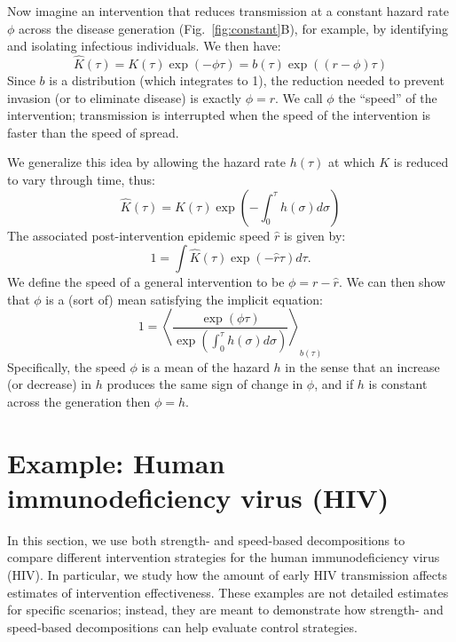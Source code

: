 \documentclass[12pt]{article}
\newcommand{\figref}[1]{Fig.~\ref{fig:#1}}
\newcommand{\eqlab}[1]{\label{eq:#1}}
\begin{document}
Now imagine an intervention that reduces transmission at a constant hazard rate $\phi$ across the disease generation (\figref{constant}B), for example, by identifying and isolating infectious individuals.
We then have:
\begin{equation}
	\hat K(\tau) = K(\tau)\exp(-\phi\tau) = b(\tau)\exp((r-\phi)\tau)
\end{equation}
Since $b$ is a distribution (which integrates to 1), the reduction needed to prevent invasion (or to eliminate disease) is exactly $\phi=r$. 
We call $\phi$ the ``speed'' of the intervention; transmission is interrupted when the speed of the intervention is faster than the speed of spread.

We generalize this idea by allowing the hazard rate $h(\tau)$ at which $K$ is reduced to vary through time, thus:
\begin{equation}
	\hat K(\tau) = K(\tau) \exp\left(-\int_0^\tau h(\sigma) d\sigma\right)
\end{equation}
The associated post-intervention epidemic speed $\hat r$ is given by:
\begin{equation}
	1 = \int \hat K(\tau) \exp(-\hat r\tau) d\tau.	
\end{equation}
We define the speed of a general intervention to be $\phi = r - \hat r$. 
We can then show that $\phi$ is a (sort of) mean satisfying the implicit equation:
\begin{equation}
	1 = \left\langle \frac{\exp(\phi \tau) }{\exp\left(\int_0^\tau h(\sigma) d\sigma\right)} \right\rangle_{b(\tau)}
	\eqlab{speedMean}
\end{equation}
Specifically, the speed $\phi$ is a mean of the hazard $h$ in the sense that an increase (or decrease) in $h$ produces the same sign of change in $\phi$, and if $h$ is constant across the generation then $\phi=h$.

\section{Example: Human immunodeficiency virus (HIV)}

In this section, we use both strength- and speed-based decompositions to compare different intervention strategies for the human immunodeficiency virus (HIV). 
In particular, we study how the amount of early HIV transmission affects estimates of intervention effectiveness. 
These examples are not detailed estimates for specific scenarios; 
instead, they are meant to demonstrate how strength- and speed-based decompositions can help evaluate control strategies.
\end{document}
